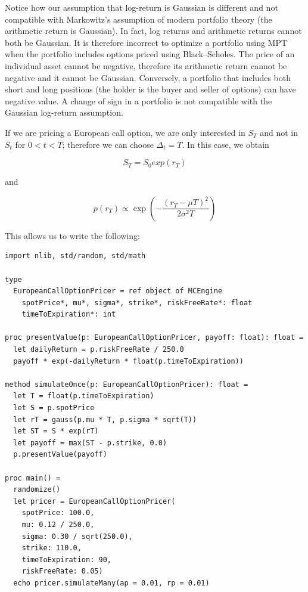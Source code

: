 \documentclass[justified, sixbynine]{tufte-book}
\def\ft{\small\tt}
\theoremstyle{plain}%
\newtheorem * {corollary}{Corollary}
\theoremstyle{definition}
\theoremstyle{remark}
\newtheorem * {remark}{Remark}
\newtheorem * {note}{Note}
\begin{document}
\begin{fullwidth}
Notice how our assumption that log-return is Gaussian is different and not compatible with Markowitz's assumption of modern portfolio theory (the arithmetic return is Gaussian). In fact, log returns and arithmetic returns cannot both be Gaussian. It is therefore incorrect to optimize a portfolio using MPT when the portfolio includes options priced using Black--Scholes. The price of an individual asset cannot be negative, therefore its arithmetic return cannot be negative and it cannot be Gaussian. Conversely, a portfolio that includes both short and long positions (the holder is the buyer and seller of options) can have negative value. A change of sign in a portfolio is not compatible with the Gaussian log-return assumption.

If we are pricing a European call option, we are only interested in $S_T$ and not in $S_t$ for $0<t<T$; therefore we can choose $\Delta_t = T$. In this case, we obtain

\begin{equation}
S_T = S_0 exp(r_T)
\end{equation}

and

\begin{equation}
p(r_T) \propto \exp\left(-\frac{(r_T-\mu T)^2}{2\sigma^2 T}\right)
\end{equation}

This allows us to write the following:

\begin{lstlisting}[caption={in file: {\ft options.nim}}]
import nlib, std/random, std/math

type
  EuropeanCallOptionPricer = ref object of MCEngine
    spotPrice*, mu*, sigma*, strike*, riskFreeRate*: float
    timeToExpiration*: int

proc presentValue(p: EuropeanCallOptionPricer, payoff: float): float =
  let dailyReturn = p.riskFreeRate / 250.0
  payoff * exp(-dailyReturn * float(p.timeToExpiration))

method simulateOnce(p: EuropeanCallOptionPricer): float =
  let T = float(p.timeToExpiration)
  let S = p.spotPrice
  let rT = gauss(p.mu * T, p.sigma * sqrt(T))
  let ST = S * exp(rT)
  let payoff = max(ST - p.strike, 0.0)
  p.presentValue(payoff)

proc main() =
  randomize()
  let pricer = EuropeanCallOptionPricer(
    spotPrice: 100.0,
    mu: 0.12 / 250.0,
    sigma: 0.30 / sqrt(250.0),
    strike: 110.0,
    timeToExpiration: 90,
    riskFreeRate: 0.05)
  echo pricer.simulateMany(ap = 0.01, rp = 0.01)


\end{lstlisting}
\end{fullwidth}
\end{document}
